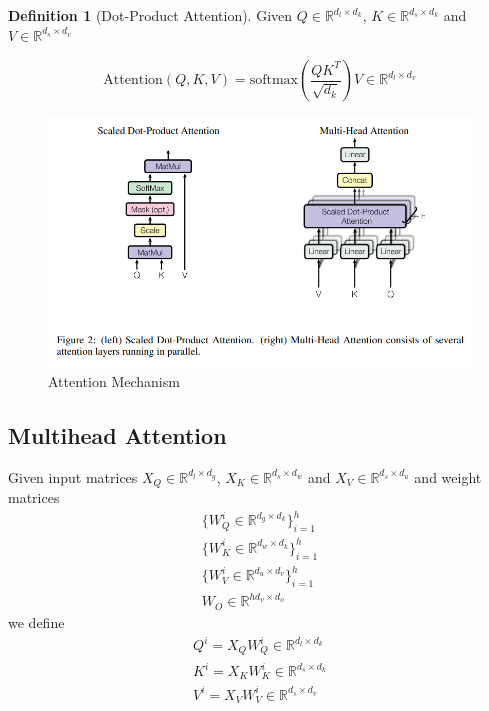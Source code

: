 \documentclass[11pt]{article}
\theoremstyle{definition}
\newtheorem{definition}{Definition}[section]
\begin{document}
\begin{definition}[Dot-Product Attention] Given $Q \in \mathbb{R}^{d_l \times d_k}$, $K \in \mathbb{R}^{d_s \times d_k}$ and $V \in \mathbb{R}^{d_s \times d_v}$

\begin{equation}
\mathrm{Attention} \left( Q,K,V \right) = \mathrm{softmax} \left( \frac{QK^T}{\sqrt{d_k}} \right) V \in \mathbb{R}^{d_l \times d_v}
\end{equation}
\end{definition}

\begin{figure}
\centering
  \includegraphics[width=\textwidth,height=\textheight,keepaspectratio]{transformers/attention_mechanism.png}
  \caption{Attention Mechanism \cite{vaswani2017attention}}
  \label{fig:attention}
\end{figure}

\subsection{Multihead Attention}
Given input matrices $X_Q \in \mathbb{R}^{d_l \times d_g}$, $X_K \in \mathbb{R}^{d_s \times d_w}$ and $X_V \in \mathbb{R}^{d_s \times d_u}$ and weight matrices
\begin{gather}
\nonumber \{W_Q^i \in \mathbb{R}^{d_g \times d_k} \}_{i=1}^h \\
\{W_K^i \in \mathbb{R}^{d_w \times d_k} \}_{i=1}^h \\
\nonumber \{W_V^i \in \mathbb{R}^{d_u \times d_v} \}_{i=1}^h \\
W_O \in \mathbb{R}^{hd_v \times d_o}
\end{gather}
we define
\begin{gather}
\nonumber Q^i = X_QW_Q^i \in \mathbb{R}^{d_l \times d_k} \\
K^i = X_KW_K^i \in \mathbb{R}^{d_s \times d_k} \\
\nonumber V^i = X_VW_V^i \in \mathbb{R}^{d_s \times d_v}
\end{gather}
\end{document}
